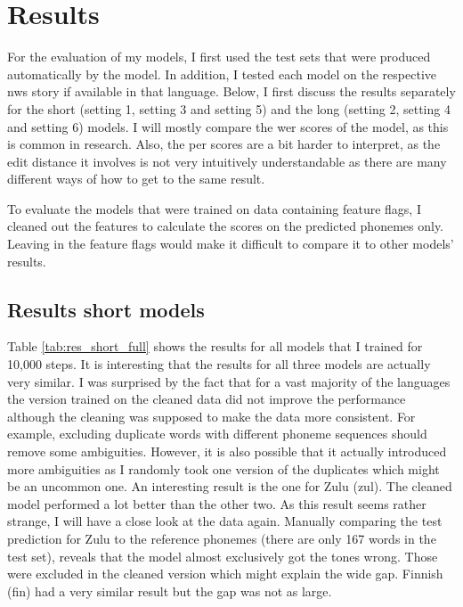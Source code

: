 \section{Results}

For the evaluation of my models, I first used the test sets that were produced automatically by the model. In addition, I tested each model on the respective \ac{nws} story if available in that language. Below, I first discuss the results separately for the short (setting 1, setting 3 and setting 5) and the long (setting 2, setting 4 and setting 6) models. I will mostly compare the \ac{wer} scores of the model, as this is common in research. Also, the \ac{per} scores are a bit harder to interpret, as the edit distance it involves is not very intuitively understandable as there are many different ways of how to get to the same result. 

To evaluate the models that were trained on data containing feature flags, I cleaned out the features to calculate the scores on the predicted phonemes only. Leaving in the feature flags would make it difficult to compare it to other models' results.

\subsection{Results short models}
Table \ref{tab:res_short_full} shows the results for all models that I trained for 10,000 steps. It is interesting that the results for all three models are actually very similar. I was surprised by the fact that for a vast majority of the languages the version trained on the cleaned data did not improve the performance although the cleaning was supposed to make the data more consistent. For example, excluding duplicate words with different phoneme sequences should remove some ambiguities. However, it is also possible that it actually introduced more ambiguities as I randomly took one version of the duplicates which might be an uncommon one. An interesting result is the one for Zulu (zul). The cleaned model performed a lot better than the other two. As this result seems rather strange, I will have a close look at the data again. Manually comparing the test prediction for Zulu to the reference phonemes (there are only 167 words in the test set), reveals that the model almost exclusively got the tones wrong. Those were excluded in the cleaned version which might explain the wide gap. Finnish (fin) had a very similar result but the gap was not as large.

